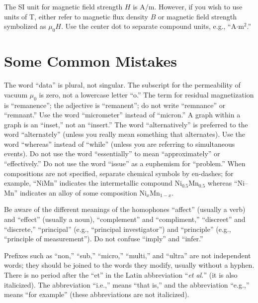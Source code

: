\documentclass{ieeeaccess}
\begin{document}
The SI unit for magnetic field strength $H$ is A/m. However, if you wish to use 
units of T, either refer to magnetic flux density $B$ or magnetic field 
strength symbolized as $\mu _{0}H$. Use the center dot to separate 
compound units, e.g., ``A$\cdot $m$^{2}$.''

\section{Some Common Mistakes}
The word ``data'' is plural, not singular. The subscript for the 
permeability of vacuum $\mu _{0}$ is zero, not a lowercase letter 
``o.'' The term for residual magnetization is ``remanence''; the adjective 
is ``remanent''; do not write ``remnance'' or ``remnant.'' Use the word 
``micrometer'' instead of ``micron.'' A graph within a graph is an 
``inset,'' not an ``insert.'' The word ``alternatively'' is preferred to the 
word ``alternately'' (unless you really mean something that alternates). Use 
the word ``whereas'' instead of ``while'' (unless you are referring to 
simultaneous events). Do not use the word ``essentially'' to mean 
``approximately'' or ``effectively.'' Do not use the word ``issue'' as a 
euphemism for ``problem.'' When compositions are not specified, separate 
chemical symbols by en-dashes; for example, ``NiMn'' indicates the 
intermetallic compound Ni$_{0.5}$Mn$_{0.5}$ whereas 
``Ni--Mn'' indicates an alloy of some composition 
Ni$_{x}$Mn$_{1-x}$.


Be aware of the different meanings of the homophones ``affect'' (usually a 
verb) and ``effect'' (usually a noun), ``complement'' and ``compliment,'' 
``discreet'' and ``discrete,'' ``principal'' (e.g., ``principal 
investigator'') and ``principle'' (e.g., ``principle of measurement''). Do 
not confuse ``imply'' and ``infer.'' 

Prefixes such as ``non,'' ``sub,'' ``micro,'' ``multi,'' and ``ultra'' are 
not independent words; they should be joined to the words they modify, 
usually without a hyphen. There is no period after the ``et'' in the Latin 
abbreviation ``\emph{et al.}'' (it is also italicized). The abbreviation ``i.e.,'' means 
``that is,'' and the abbreviation ``e.g.,'' means ``for example'' (these 
abbreviations are not italicized).
\end{document}
